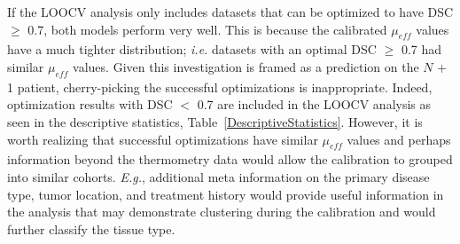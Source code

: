 \documentclass[12pt]{article}
\begin{document}
If the LOOCV analysis only includes datasets that can be optimized to
have DSC $\geq$ 0.7, both models perform very well. This is because
the calibrated $\mu_\textit{eff}$ values have a much tighter distribution;
\textit{i.e.} datasets with an optimal DSC $\geq$ 0.7 had similar $\mu_\textit{eff}$ values.
Given this investigation is framed as a prediction on the $N$ + 1 patient,
cherry-picking the successful optimizations is inappropriate. Indeed, optimization results
with DSC $<$ 0.7 are included in the LOOCV analysis as seen in the descriptive statistics,
Table~\ref{DescriptiveStatistics}. However,
it is worth realizing that successful optimizations have similar
$\mu_\textit{eff}$ values and perhaps information beyond the
thermometry data would allow the calibration to grouped into similar cohorts.
\textit{E.g.}, additional meta information on the primary disease type, tumor location, and treatment history
would provide
useful information in the analysis that may demonstrate clustering during the calibration
and would further classify the tissue type.
\end{document}
